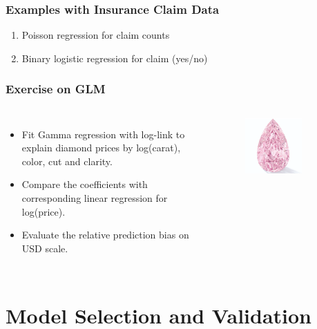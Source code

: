 \documentclass[
    utf8,
    aspectratio=169
]{beamer}  %
\begin{document}
\begin{frame}
	\frametitle{Examples with Insurance Claim Data}
	\begin{enumerate}
		\item Poisson regression for claim counts
		\item Binary logistic regression for claim (yes/no)
	\end{enumerate}
\end{frame}

\begin{frame}
	\frametitle{Exercise on GLM}
	\begin{columns}
		\begin{itemize}
			\item Fit Gamma regression with log-link to explain diamond prices by log(carat), color, cut and clarity. 
			\item Compare the coefficients with corresponding linear regression for log(price).
			\item Evaluate the relative prediction bias on USD scale.
		\end{itemize}
		\begin{figure}
			\includegraphics[width=0.7\textwidth]{pics/dia2.png}
		\end{figure}
	\end{columns}
\end{frame}

\section{Model Selection and Validation}
\end{document}
